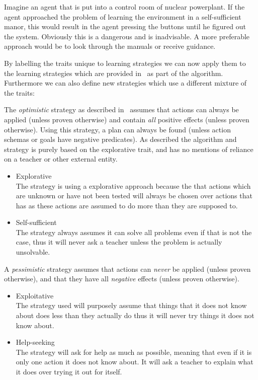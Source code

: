 \documentclass[../Master.tex]{subfiles}
\begin{document}
    \begin{example}
    	Imagine an agent that is put into a control room of nuclear powerplant.
    	 If the agent approached the problem of learning the environment in a self-sufficient manor, 
    	 this would result in the agent pressing the buttons until he figured out the system.
    	 Obviously this is a dangerous and is inadvisable. 
    	 A more preferable approach would be to look through the manuals or receive guidance.
    \end{example}
	By labelling the traits unique to learning strategies we can now apply them to the learning strategies which are provided in~\cite{Walsh2008} as part of the algorithm. Furthermore we can also define new strategies which use a different mixture of the traits:
    \begin{example}
		[{Optimisic}] The \emph{optimistic} strategy as described in~\cite{Walsh2008} assumes that actions
	    can always be applied (unless proven otherwise) and contain \emph{all}
	    positive effects (unless proven otherwise). Using this strategy, a
	    plan can always be found (unless action schemas or goals have negative
	    predicates). As described the algorithm and strategy is purely based on the explorative trait, and has no mentions of reliance on a teacher or other external entity.
	    \begin{itemize}
	    \item Explorative\\
	    The strategy is using a explorative approach because the that actions
	    which are unknown or have not been tested will always be chosen over
	    actions that has as these actions are assumed to do more than they
	    are supposed to.
	    \item Self-sufficient\\
	    The strategy always assumes it can solve all problems even if that
	    is not the case, thus it will never ask a teacher unless the problem
	    is actually unsolvable.
	    \end{itemize}
	\end{example}
    \begin{example}
    [{Pessimistic}] A \emph{pessimistic} strategy assumes that actions
    can \emph{never} be applied (unless proven otherwise), and that they
    have all \emph{negative} effects (unless proven otherwise).
    \begin{itemize}
    \item Exploitative\\
    The strategy used will purposely assume that things that it does not
    know about does less than they actually do thus it will never try
    things it does not know about.
    \item Help-seeking\\
    The strategy will ask for help as much as possible, meaning that even
    if it is only one action it does not know about. It will ask a teacher
    to explain what it does over trying it out for itself.
    \end{itemize}
    \end{example}
\end{document}
